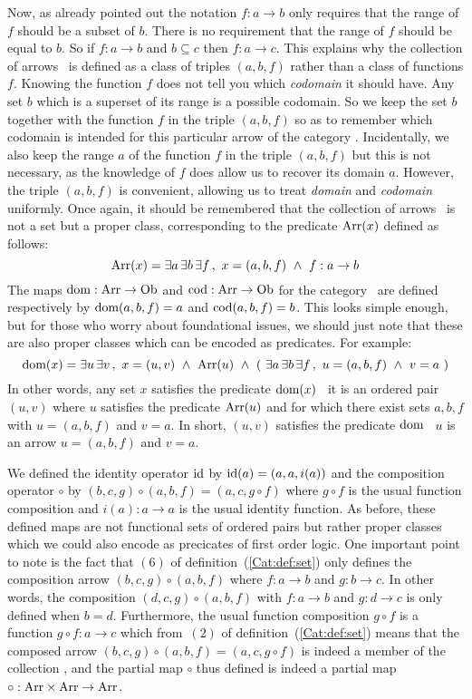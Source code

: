 Now, as already pointed
out the notation $f:a\to b$ only requires that the range of $f$ should be
a subset of $b$. There is no requirement that the range of $f$ should be
equal to $b$. So if $f:a\to b$ and $b\subseteq c$ then $f:a\to c$.
This explains why the collection of arrows \arr\ is defined as a class of 
triples $(a,b,f)$ rather than a class of functions $f$. Knowing the 
function $f$ does not tell you which {\em codomain} it should have. Any 
set $b$ which is a superset of its range is a possible codomain. So we 
keep the set $b$ together with the function $f$ in the triple $(a,b,f)$
so as to remember which codomain is intended for this particular arrow
of the category \Set. Incidentally, we also keep the range $a$ of the 
function $f$ in the triple $(a,b,f)$ but this is not necessary, as the
knowledge of $f$ does allow us to recover its domain $a$. However,
the triple $(a,b,f)$ is convenient, allowing us to treat {\em domain} 
and {\em codomain} uniformly. Once again, it should be remembered that
the collection of arrows \arr\ is not a set but a proper class, 
corresponding to the predicate $\mbox{\rm Arr}(x)$ defined as follows:
    \[
        \mbox{\rm Arr}(x)=\exists a\,\exists b\,\exists f\,,\  
        x = (a,b,f)\ \land\ f : a \to b
    \]
The maps $\mbox{\rm dom}:\mbox{\rm Arr}\to\mbox{\rm Ob}$ and $\mbox{\rm cod}:\mbox{\rm Arr}\to\mbox{\rm Ob}$ for the category \Set\
are defined respectively by $\mbox{\rm dom}(a,b,f)=a$ and $\mbox{\rm cod}(a,b,f)=b$. This 
looks simple enough, but for those who worry about foundational issues,
we should just note that these are also proper classes which can be
encoded as predicates. For example:
    \[
    \dom(x)=\exists u\,\exists v\,,\ x = (u,v)\ \land\ \arr(u)\ \land 
    \ (\ \exists a\,\exists b\,\exists f\,,\  u = (a,b,f)\ \land\ 
    v = a\ ) 
    \]
In other words, any set $x$ satisfies the predicate $\mbox{\rm dom}(x)$ \ifand\ 
it is an ordered pair $(u,v)$ where $u$ satisfies the predicate $\mbox{\rm Arr}(u)$
and for which there exist sets $a,b,f$ with $u=(a,b,f)$ and $v=a$.
In short, $(u,v)$ satisfies the predicate $\mbox{\rm dom}$ \ifand\ $u$ is an
arrow $u=(a,b,f)$ and $v=a$.

We defined the identity operator $\mbox{\rm id}$ by $\mbox{\rm id}(a)=(a,a,i(a))$ and the 
composition operator $\circ$ by $(b,c,g)\circ(a,b,f)= (a,c,g\circ f)$ 
where $g\circ f$ is the usual function composition and $i(a):a\to a$ is
the usual identity function. As before, these defined maps are not 
functional sets of ordered pairs but rather proper classes which we 
could also encode as precicates of first order logic. One important
point to note is the fact that $(6)$ of definition~(\ref{Cat:def:set})
only defines the composition arrow $(b,c,g)\circ(a,b,f)$ where
$f:a\to b$ and $g:b\to c$. In other words, the composition 
$(d,c,g)\circ(a,b,f)$ with $f:a\to b$ and $g:d\to c$ is only 
defined when $b=d$. Furthermore, the usual function composition
$g\circ f$ is a function $g\circ f:a \to c$ which from~$(2)$ of
definition~(\ref{Cat:def:set}) means that the composed arrow
$(b,c,g)\circ(a,b,f)=(a,c,g\circ f)$ is indeed a member of the
collection \arr, and the partial map $\circ$ thus defined is 
indeed a partial map $\circ:\mbox{\rm Arr}\times\mbox{\rm Arr}\to\mbox{\rm Arr}$.


